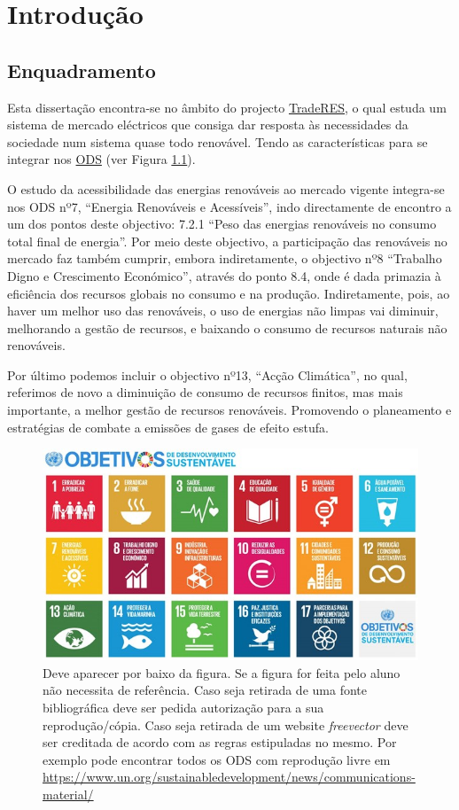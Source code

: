 \chapter{Introdução}

\section{Enquadramento \label{se:enquadramento}}
Esta dissertação encontra-se no âmbito do projecto \href{https://traderes.eu/}{TradeRES}, o qual estuda um sistema de mercado eléctricos que consiga dar resposta às necessidades da sociedade num sistema quase todo renovável. Tendo as características para se integrar nos \href{https://ods.pt/ods/}{ODS} (ver Figura \ref{fig:ODS}).

O estudo da acessibilidade das energias renováveis ao mercado vigente integra-se nos ODS nº7, “Energia Renováveis e Acessíveis”, indo directamente de encontro a um dos pontos deste objectivo: 7.2.1 “Peso das energias renováveis no consumo total final de energia”. Por meio deste objectivo, a participação das renováveis no mercado faz também cumprir, embora indiretamente, o objectivo nº8 “Trabalho Digno e Crescimento Económico”, através do ponto 8.4, onde é dada primazia à eficiência dos recursos globais no consumo e na produção. Indiretamente, pois, ao haver um melhor uso das renováveis, o uso de energias não limpas vai diminuir, melhorando a gestão de recursos, e baixando o consumo de recursos naturais não renováveis.

Por último podemos incluir o objectivo nº13, “Acção Climática”, no qual, referimos de novo a diminuição de consumo de recursos finitos, mas mais importante, a melhor gestão de recursos renováveis. Promovendo o planeamento e estratégias de combate a emissões de gases de efeito estufa.


\begin{figure}[h]
    \centering
    \includegraphics{Imagens/DesenvolvimentoSustentavel.jpg}
    \caption{Deve aparecer por baixo da figura. Se a figura for feita pelo aluno não necessita de referência. Caso seja retirada de uma fonte bibliográfica deve ser pedida autorização para a sua reprodução/cópia. Caso seja retirada de um website \textit{freevector} deve ser creditada de acordo com as regras estipuladas no mesmo. Por exemplo pode encontrar todos os ODS com reprodução livre em \href{URL}{https://www.un.org/sustainabledevelopment/news/communications-material/}}
    \label{fig:ODS}
\end{figure}

